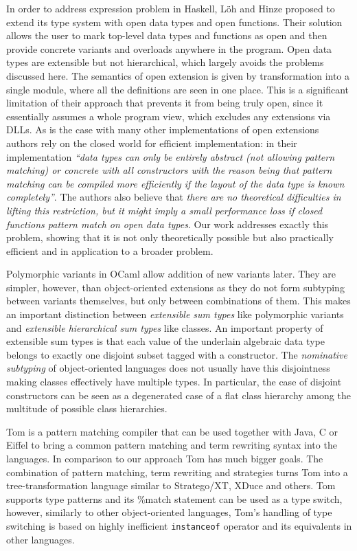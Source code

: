 \documentclass[preprint]{sigplanconf}
\makeatletter
\DeclareRobustCommand{\code}[1]{{\lstinline[breaklines=false,escapechar=@]{#1}}}
\makeatother
\begin{document}
In order to address expression problem in Haskell, L\"{o}h and Hinze proposed to 
extend its type system with open data types and open functions\cite{LohHinze2006}.
Their solution allows the user to mark top-level data types and functions as 
open and then provide concrete variants and overloads anywhere in the program. 
Open data types are extensible but not hierarchical, which largely avoids the 
problems discussed here. The semantics of open extension is given by 
transformation into a single module, where all the definitions are seen in one 
place. This is a significant limitation of their approach that prevents it from 
being truly open, since it essentially assumes a whole program view, which 
excludes any extensions via DLLs. As is the case with many other implementations 
of open extensions authors rely on the closed world for efficient 
implementation: in their implementation \emph{``data types can only be entirely 
abstract (not allowing pattern matching) or concrete with all constructors with 
the reason being that pattern matching can be compiled more efficiently if the 
layout of the data type is known completely''}. The authors also believe that 
\emph{there are no theoretical difficulties in lifting this restriction, but it 
might imply a small performance loss if closed functions pattern match on open 
data types}. Our work addresses exactly this problem, showing that it is not 
only theoretically possible but also practically efficient and in application to 
a broader problem.

Polymorphic variants in OCaml\cite{garrigue-98} allow addition of new variants 
later. They are simpler, however, than object-oriented extensions as they do not 
form subtyping between variants themselves, but only between combinations of them. 
This makes an important distinction between \emph{extensible sum types} like 
polymorphic variants and \emph{extensible hierarchical sum types} like classes.
An important property of extensible sum types is that each value of the 
underlain algebraic data type belongs to exactly one disjoint subset tagged with 
a constructor. The \emph{nominative subtyping} of object-oriented languages does 
not usually have this disjointness making classes effectively have multiple 
types. In particular, the case of disjoint constructors can be seen as a 
degenerated case of a flat class hierarchy among the multitude of possible class 
hierarchies.

Tom is a pattern matching compiler that can be used together with Java, C or 
Eiffel to bring a common pattern matching and term rewriting syntax into the 
languages\cite{Moreau:2003}. In comparison to our approach Tom has much bigger 
goals. The combination of pattern matching, term rewriting and strategies turns 
Tom into a tree-transformation language similar to Stratego/XT, XDuce and 
others. Tom supports type patterns and its \%match statement can be used as a 
type switch, however, similarly to other object-oriented languages, Tom's 
handling of type switching is based on highly inefficient \code{instanceof} 
operator and its equivalents in other languages.
\end{document}
